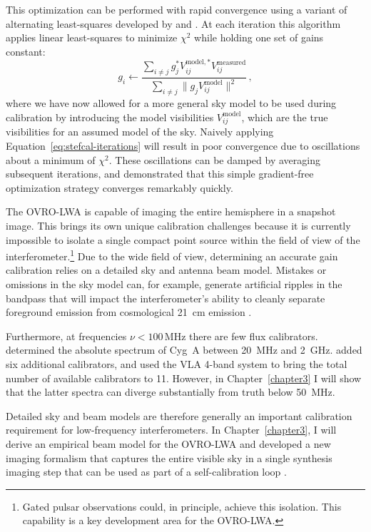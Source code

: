 \begin{bibunit}
This optimization can be performed with rapid convergence using a variant of alternating
least-squares developed by \citet{2008ISTSP...2..707M} and \citet{2014A&A...571A..97S}. At each
iteration this algorithm applies linear least-squares to minimize $\chi^2$ while holding one set of
gains constant:
\begin{equation}\label{eq:stefcal-iterations}
    g_i \leftarrow \frac
        {\sum_{i \neq j} g_j^* V_{ij}^{\text{model},*} V_{ij}^\text{measured}}
        {\sum_{i \neq j} \| g_j V_{ij}^\text{model} \|^2}\,,
\end{equation}
where we have now allowed for a more general sky model to be used during calibration by introducing
the model visibilities $V_{ij}^\text{model}$, which are the true visibilities for an assumed model
of the sky.  Naively applying Equation~\ref{eq:stefcal-iterations} will result in poor convergence
due to oscillations about a minimum of $\chi^2$.  These oscillations can be damped by averaging
subsequent iterations, and \citet{2014A&A...571A..97S} demonstrated that this simple gradient-free
optimization strategy converges remarkably quickly.

The OVRO-LWA is capable of imaging the entire hemisphere in a snapshot image. This brings its own
unique calibration challenges because it is currently impossible to isolate a single compact point source
within the field of view of the interferometer.\footnote{
    Gated pulsar observations could, in principle, achieve this isolation. This capability is a key
    development area for the OVRO-LWA.
}
Due to the wide field of view, determining an accurate gain calibration relies on a detailed sky and
antenna beam model. Mistakes or omissions in the sky model can, for example, generate artificial
ripples in the bandpass that will impact the interferometer's ability to cleanly separate foreground
emission from cosmological 21~cm emission \citep{2016MNRAS.461.3135B, 2017MNRAS.470.1849E}.

Furthermore, at frequencies $\nu < 100\,\text{MHz}$ there are few flux calibrators.
\citet{1977A&A....61...99B} determined the absolute spectrum of Cyg~A between 20~MHz and 2~GHz.
\citet{2012MNRAS.423L..30S} added six additional calibrators, and \citet{2017ApJS..230....7P} used
the VLA 4-band system to bring the total number of available calibrators to 11. However, in
Chapter~\ref{chapter3} I will show that the latter spectra can diverge substantially from truth
below 50~MHz.

Detailed sky and beam models are therefore generally an important calibration requirement for
low-frequency interferometers.  In Chapter~\ref{chapter3}, I will derive an empirical beam model for
the OVRO-LWA and developed a new imaging formalism that captures the entire visible sky in a single
synthesis imaging step that can be used as part of a self-calibration loop
\citep{1978ApJ...223...25R}.


\end{bibunit}
